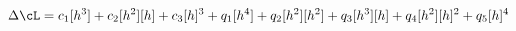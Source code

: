 \begin{equation}
\Delta \cL = c_1 [h^3] + c_2 [h^2] [h] + c_3 [h]^3 + q_1 [h^4] + q_2 [h^2] [h^2]
+ q_3 [h^3] [h] + q_4 [h^2] [h]^2  + q_5 [h]^4
\end{equation}


